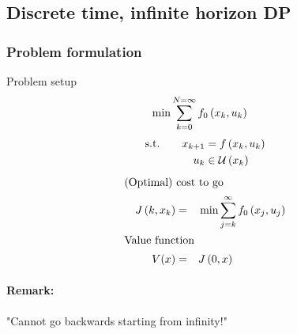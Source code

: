 \subsection{Discrete time, infinite horizon DP}
\subsubsection{Problem formulation}
\begin{optExample}{Problem setup}
\begin{align}
    \min    & \sum_{k=0}^{N=\infty} f_0 \left( x_k,u_k \right)
\end{align}
\begin{alignat*}{6}
\st{} \quad
&& \x{k+1}  &= f \paren{x_k,u_k}\\
&& u_k      &\in \setU{x_k}
\end{alignat*}
\begin{alignat}{4}
\intertext{(Optimal) cost to go}
    & & J \left( k,x_k \right) &=&& \min \sum_{j=k}^{\infty} f_0 \left( x_j, u_j \right)\\
\intertext{Value function}
    & &     V(x) &=&& J \left( 0,x \right)
\end{alignat}
\end{optExample}

\paragraph{Remark:} "Cannot go backwards starting from infinity!"~\\

